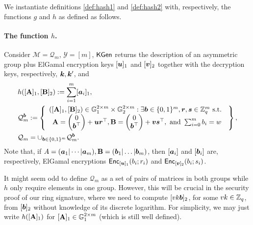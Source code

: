 
We instantiate definitions \ref{def:hash1} and \ref{def:hash2}  with, respectively, the functions $g$ and $h$ as defined as follows.

\paragraph{The function $h$.} Consider $\mathcal{M}=\mathcal{Q}_m$, $\mathcal{Y}=[m]$, $\mathsf{KGen}$ returns the description of an asymmetric group plus ElGamal encryption keys $[{\boldsymbol{u}}]_1$  and $[{\boldsymbol{v}}]_2$ together with the decryption keys, respectively, ${\boldsymbol{k}},{\boldsymbol{k}}'$, and
\begin{align*}
&h([\mathbf{{A}}]_1,[\mathbf{{B}}]_2):= \sum_{i=1}^m[{\boldsymbol{a}}_i]_1,\\
&\mathcal{Q}_m^{\boldsymbol{b}} := \left\{
\begin{array}{c}
([\mathbf{{A}}]_1,[\mathbf{{B}}]_2) \in \mathbb{G}_1^{2\times m}\times\mathbb{G}_2^{2\times m}:
\exists {\boldsymbol{b}} \in\{0,1\}^m,{\boldsymbol{r}},{\boldsymbol{s}}\in\mathbb{Z}_q^m\text{ s.t. }\\
{\mathbf{{A}} = \left(\begin{matrix}0\\{\boldsymbol{b}}^\top\end{matrix}\right)+{\boldsymbol{u}}{\boldsymbol{r}}^\top,
\mathbf{{B}} = \left(\begin{matrix}0\\{\boldsymbol{b}}^\top\end{matrix}\right)+{\boldsymbol{v}}{\boldsymbol{s}}^\top},
\text{ and }\sum_{i=0}^m b_i = w
\end{array}\right\},\\
&\mathcal{Q}_m = \cup_{{\boldsymbol{b}}\in\{0,1\}^m} \mathcal{Q}_m^{\boldsymbol{b}}.
\end{align*}
Note that, if $A=({\boldsymbol{a}}_1|\cdots|{\boldsymbol{a}}_m),\mathbf{{B}}=({\boldsymbol{b}}_1|\ldots|{\boldsymbol{b}}_m)$, then $[{\boldsymbol{a}}_i]$ and $[{\boldsymbol{b}}_i]$ are, respectively, ElGamal encryptions $\mathsf{Enc}_{[{\boldsymbol{u}}]_1}(b_i;r_i)$ and $\mathsf{Enc}_{[{\boldsymbol{v}}]_2}(b_i;s_i)$.

It might seem odd to define $\mathcal{Q}_m$ as a set of pairs of matrices in both groups while $h$ only require elements in one group. However, this will be crucial in the security proof of our ring signature, where we need to compute $[vk {\boldsymbol{b}}]_2$, for some $vk\in\mathbb{Z}_q$,
from  $[{\boldsymbol{b}}]_2$ without knowledge of its discrete logarithm. For simplicity, we may just write $h([\mathbf{{A}}]_1)$ for $[\mathbf{{A}}]_1\in \mathbb{G}_1^{2\times m}$ (which is still well defined).



